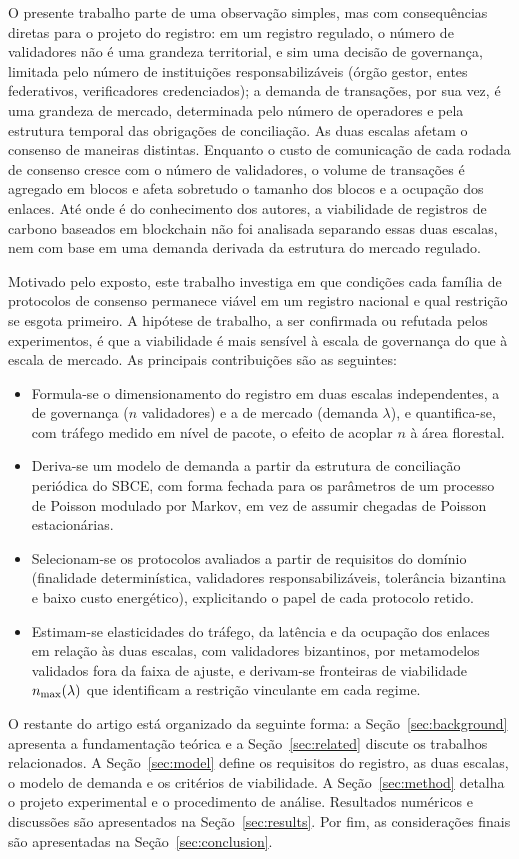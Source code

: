 O presente trabalho parte de uma observação simples, mas com consequências diretas para o projeto do registro: em um registro regulado, o número de validadores não é uma grandeza territorial, e sim uma decisão de governança, limitada pelo número de instituições responsabilizáveis (órgão gestor, entes federativos, verificadores credenciados); a demanda de transações, por sua vez, é uma grandeza de mercado, determinada pelo número de operadores e pela estrutura temporal das obrigações de conciliação. As duas escalas afetam o consenso de maneiras distintas. Enquanto o custo de comunicação de cada rodada de consenso cresce com o número de validadores, o volume de transações é agregado em blocos e afeta sobretudo o tamanho dos blocos e a ocupação dos enlaces. Até onde é do conhecimento dos autores, a viabilidade de registros de carbono baseados em blockchain não foi analisada separando essas duas escalas, nem com base em uma demanda derivada da estrutura do mercado regulado.

Motivado pelo exposto, este trabalho investiga em que condições cada família de protocolos de consenso permanece viável em um registro nacional e qual restrição se esgota primeiro. A hipótese de trabalho, a ser confirmada ou refutada pelos experimentos, é que a viabilidade é mais sensível à escala de governança do que à escala de mercado. As principais contribuições são as seguintes:

\begin{itemize}
\item Formula-se o dimensionamento do registro em duas escalas independentes, a de governança ($n$ validadores) e a de mercado (demanda $\lambda$), e quantifica-se, com tráfego medido em nível de pacote, o efeito de acoplar $n$ à área florestal.
\item Deriva-se um modelo de demanda a partir da estrutura de conciliação periódica do SBCE, com forma fechada para os parâmetros de um processo de Poisson modulado por Markov, em vez de assumir chegadas de Poisson estacionárias.
\item Selecionam-se os protocolos avaliados a partir de requisitos do domínio (finalidade determinística, validadores responsabilizáveis, tolerância bizantina e baixo custo energético), explicitando o papel de cada protocolo retido.
\item Estimam-se elasticidades do tráfego, da latência e da ocupação dos enlaces em relação às duas escalas, com validadores bizantinos, por metamodelos validados fora da faixa de ajuste, e derivam-se fronteiras de viabilidade $n_{\max}(\lambda)$ que identificam a restrição vinculante em cada regime.
\end{itemize}

O restante do artigo está organizado da seguinte forma: a Seção~\ref{sec:background} apresenta a fundamentação teórica e a Seção~\ref{sec:related} discute os trabalhos relacionados. A Seção~\ref{sec:model} define os requisitos do registro, as duas escalas, o modelo de demanda e os critérios de viabilidade. A Seção~\ref{sec:method} detalha o projeto experimental e o procedimento de análise. Resultados numéricos e discussões são apresentados na Seção~\ref{sec:results}. Por fim, as considerações finais são apresentadas na Seção~\ref{sec:conclusion}.
